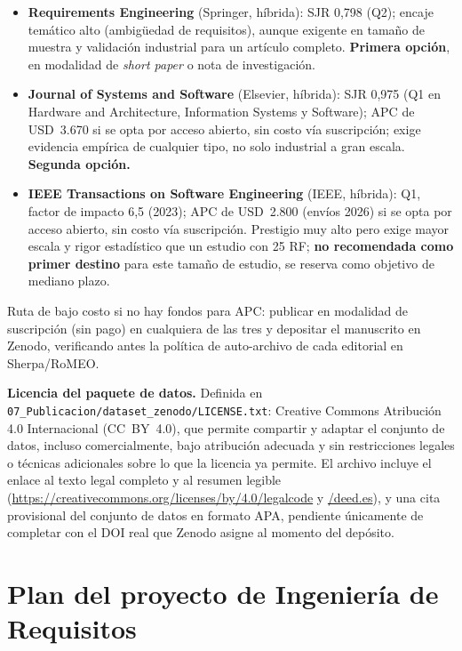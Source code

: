 \documentclass[11pt,a4paper]{article}
\begin{document}
\begin{itemize}[nosep]
\item \textbf{Requirements Engineering} (Springer, híbrida): SJR 0,798 (Q2); encaje temático alto (ambigüedad de requisitos), aunque exigente en tamaño de muestra y validación industrial para un artículo completo. \textbf{Primera opción}, en modalidad de \textit{short paper} o nota de investigación.
\item \textbf{Journal of Systems and Software} (Elsevier, híbrida): SJR 0,975 (Q1 en Hardware and Architecture, Information Systems y Software); APC de USD~3.670 si se opta por acceso abierto, sin costo vía suscripción; exige evidencia empírica de cualquier tipo, no solo industrial a gran escala. \textbf{Segunda opción.}
\item \textbf{IEEE Transactions on Software Engineering} (IEEE, híbrida): Q1, factor de impacto 6,5 (2023); APC de USD~2.800 (envíos 2026) si se opta por acceso abierto, sin costo vía suscripción. Prestigio muy alto pero exige mayor escala y rigor estadístico que un estudio con 25 RF; \textbf{no recomendada como primer destino} para este tamaño de estudio, se reserva como objetivo de mediano plazo.
\end{itemize}

Ruta de bajo costo si no hay fondos para APC: publicar en modalidad de suscripción (sin pago) en cualquiera de las tres y depositar el manuscrito en Zenodo, verificando antes la política de auto-archivo de cada editorial en Sherpa/RoMEO.

\textbf{Licencia del paquete de datos.} Definida en \texttt{07\_Publicacion/dataset\_zenodo/LICENSE.txt}: Creative Commons Atribución 4.0 Internacional (CC~BY~4.0), que permite compartir y adaptar el conjunto de datos, incluso comercialmente, bajo atribución adecuada y sin restricciones legales o técnicas adicionales sobre lo que la licencia ya permite. El archivo incluye el enlace al texto legal completo y al resumen legible (\url{https://creativecommons.org/licenses/by/4.0/legalcode} y \url{/deed.es}), y una cita provisional del conjunto de datos en formato APA, pendiente únicamente de completar con el DOI real que Zenodo asigne al momento del depósito.

\appendix
\section{Plan del proyecto de Ingeniería de Requisitos}
\end{document}
